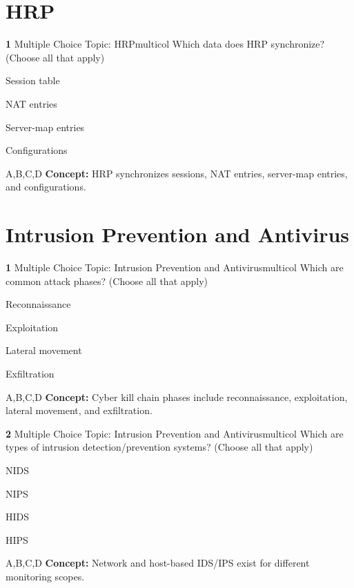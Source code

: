 \documentclass[10pt,a4paper]{article}
\begin{document}
\section{HRP}
\begin{qcard}{\color{white}\textbf{1} \hfill \small Multiple Choice \textbar{} Topic: HRP}{multicol}
Which data does HRP synchronize? (Choose all that apply)

\begin{qoptions}
\item Session table
\item NAT entries
\item Server-map entries
\item Configurations
\end{qoptions}
\begin{explainbox}{A,B,C,D}
\textbf{Concept:} HRP synchronizes sessions, NAT entries, server-map entries, and configurations.
\end{explainbox}
\end{qcard}

\section{Intrusion Prevention and Antivirus}
\begin{qcard}{\color{white}\textbf{1} \hfill \small Multiple Choice \textbar{} Topic: Intrusion Prevention and Antivirus}{multicol}
Which are common attack phases? (Choose all that apply)

\begin{qoptions}
\item Reconnaissance
\item Exploitation
\item Lateral movement
\item Exfiltration
\end{qoptions}
\begin{explainbox}{A,B,C,D}
\textbf{Concept:} Cyber kill chain phases include reconnaissance, exploitation, lateral movement, and exfiltration.
\end{explainbox}
\end{qcard}

\begin{qcard}{\color{white}\textbf{2} \hfill \small Multiple Choice \textbar{} Topic: Intrusion Prevention and Antivirus}{multicol}
Which are types of intrusion detection/prevention systems? (Choose all that apply)

\begin{qoptions}
\item NIDS
\item NIPS
\item HIDS
\item HIPS
\end{qoptions}
\begin{explainbox}{A,B,C,D}
\textbf{Concept:} Network and host-based IDS/IPS exist for different monitoring scopes.
\end{explainbox}
\end{qcard}
\end{document}
